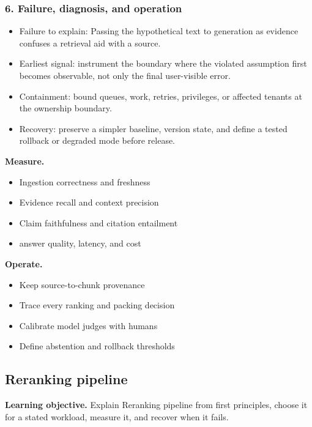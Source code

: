 \subsubsection*{6. Failure, diagnosis, and operation}
\begin{itemize}
\item Failure to explain: Passing the hypothetical text to generation as evidence confuses a retrieval aid with a source.
\item Earliest signal: instrument the boundary where the violated assumption first becomes observable, not only the final user-visible error.
\item Containment: bound queues, work, retries, privileges, or affected tenants at the ownership boundary.
\item Recovery: preserve a simpler baseline, version state, and define a tested rollback or degraded mode before release.
\end{itemize}
\textbf{Measure.}\begin{itemize}
\item Ingestion correctness and freshness
\item Evidence recall and context precision
\item Claim faithfulness and citation entailment
\item answer quality, latency, and cost
\end{itemize}
\textbf{Operate.}\begin{itemize}
\item Keep source-to-chunk provenance
\item Trace every ranking and packing decision
\item Calibrate model judges with humans
\item Define abstention and rollback thresholds
\end{itemize}
\subsection{Reranking pipeline}
\textbf{Learning objective.} Explain Reranking pipeline from first principles, choose it for a stated workload, measure it, and recover when it fails.
